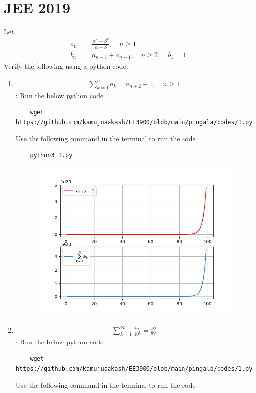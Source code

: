 \documentclass[journal,12pt,twocolumn]{IEEEtran}
\renewcommand\thesection{\arabic{section}}
\begin{document}
\section{JEE 2019}
Let 
\begin{align}
a_n &= \frac{\alpha^{n}-\beta^{n}}{\alpha - \beta}, \quad n \ge 1
\\
b_n &= a_{n-1} + a_{n+1}, \quad n \ge 2, \quad b_1 =1
\label{eq:10-orig-diff}
\end{align}
Verify the following using a python code.
\begin{enumerate}[label=\thesection.\arabic*
,ref=\thesection.\theenumi]
\item 
\begin{align}
	\sum_{k=1}^{n}a_k = a_{n+2}-1, \quad n \ge 1
\end{align}
\solution:
Run the below python code 
\begin{lstlisting}
	wget https://github.com/kamujuaakash/EE3900/blob/main/pingala/codes/1.py
\end{lstlisting}
Use the following command in the terminal to run the code
\begin{lstlisting}
	python3 1.py
\end{lstlisting}
\begin{figure}[h]
	\centering
	\includegraphics[width=0.7\columnwidth]{./figs/1_1.png}
	\caption{}
\end{figure}
\item 
\begin{align}
	\sum_{k=1}^{\infty}\frac{a_k}{10^k} =\frac{10}{89}
\end{align}
\solution:
Run the below python code 
\begin{lstlisting}
	wget https://github.com/kamujuaakash/EE3900/blob/main/pingala/codes/1.py
\end{lstlisting}
Use the following command in the terminal to run the code

\end{enumerate}
\end{document}
